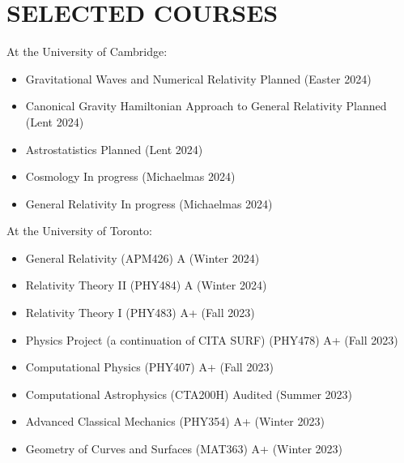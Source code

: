 \documentclass[a4paper,10pt]{extarticle}
\begin{document}
\section*{SELECTED COURSES}
At the University of Cambridge:
\begin{itemize}
    \item Gravitational Waves and Numerical Relativity \hfill Planned (Easter 2024)

    \item Canonical Gravity Hamiltonian Approach to General Relativity \hfill Planned (Lent 2024)

    \item Astrostatistics \hfill Planned (Lent 2024)

    \item Cosmology \hfill In progress (Michaelmas 2024)

    \item General Relativity \hfill In progress (Michaelmas 2024)
\end{itemize}

At the University of Toronto:
\begin{itemize}
    \item General Relativity (APM426) \hfill A (Winter 2024)
    
    \item Relativity Theory II (PHY484) \hfill A (Winter 2024)

    \item Relativity Theory I (PHY483) \hfill A+ (Fall 2023)

    \item Physics Project (a continuation of CITA SURF) (PHY478) \hfill A+ (Fall 2023)

    \item Computational Physics (PHY407) \hfill A+ (Fall 2023)

    \item Computational Astrophysics (CTA200H) \hfill Audited (Summer 2023)

    \item Advanced Classical Mechanics (PHY354) \hfill A+ (Winter 2023)

    \item Geometry of Curves and Surfaces (MAT363) \hfill A+ (Winter 2023)
\end{itemize}


\newpage
\end{document}

